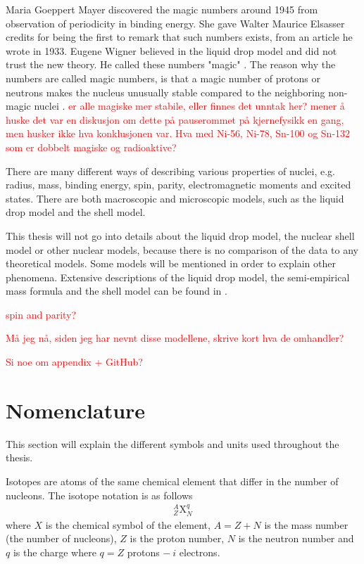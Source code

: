 \documentclass[twoside,english]{uiofysmaster/uiofysmaster}
\begin{document}
Maria Goeppert Mayer discovered the magic numbers around 1945 from observation of periodicity in binding energy. 
She gave Walter Maurice Elsasser credits for being the first to remark that such numbers exists, from an article he wrote in 1933. 
Eugene Wigner believed in the liquid drop model and did not trust the new theory. 
He called these numbers "magic" \cite{Mayer1964, MIT-OCW}. 
The reason why the numbers are called magic numbers, is that a magic number of protons or neutrons makes the nucleus unusually stable compared to the neighboring non-magic nuclei \cite{Mayer1964}. 
\textcolor{red}{er alle magiske mer stabile, eller finnes det unntak her? mener å huske det var en diskusjon om dette på pauserommet på kjernefysikk en gang, men husker ikke hva konklusjonen var. Hva med Ni-56, Ni-78, Sn-100 og Sn-132 som er dobbelt magiske og radioaktive?}


There are many different ways of describing various properties of nuclei, e.g. radius, mass, binding energy, spin, parity, electromagnetic moments and excited states.
There are both macroscopic and microscopic models, such as the liquid drop model and the shell model. 

This thesis will not go into details about the liquid drop model, the nuclear shell model or other nuclear models, because there is no comparison of the data to any theoretical models.
Some models will be mentioned in order to explain other phenomena.
Extensive descriptions of the liquid drop model, the semi-empirical mass formula and the shell model can be found in \cite{Krane}.


\textcolor{red}{spin and parity?}

\textcolor{red}{Må jeg nå, siden jeg har nevnt disse modellene, skrive kort hva de omhandler?}

\textcolor{red}{Si noe om appendix + GitHub?}



\section{Nomenclature}
This section will explain the different symbols and units used throughout the thesis.

Isotopes are atoms of the same chemical element that differ in the number of nucleons.
The isotope notation is as follows
\begin{align*}
	^A_Z\text{X}_N^q
\end{align*}
where $X$ is the chemical symbol of the element, $A = Z + N$ is the mass number (the number of nucleons), $Z$ is the proton number, $N$ is the neutron number and $q$ is the charge where $q = Z$ protons $- ~i$ electrons. 
\end{document}
